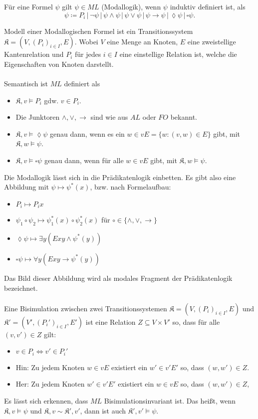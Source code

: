Für eine Formel $\psi$ gilt $\psi\in ML$ (Modallogik), wenn $\psi$ induktiv definiert ist, als
\[\psi\coloneqq P_i \,\vert\, \neg\psi \,\vert\, \psi\land\psi \,\vert\, \psi\lor\psi \,\vert\, \psi\rightarrow\psi \,\vert\, \lozenge\psi \,\vert\, \square\psi.\]

Modell einer Modallogischen Formel ist ein Transitionssystem $\mathfrak{K}=(V,(P_i)_{i\in I}, E)$. Wobei $V$ eine Menge an Knoten, $E$ eine zweistellige Kantenrelation und $P_i$ für jedes $i\in I$ eine einstellige Relation ist, welche die Eigenschaften von Knoten darstellt.
\\
\\
Semantisch ist $ML$ definiert als
\begin{itemize}
	\item $\mathfrak{K},v\models P_i$ gdw. $v\in P_i$.
	\item Die Junktoren $\land,\lor,\rightarrow$ sind wie aus $AL$ oder $FO$ bekannt.
	\item $\mathfrak{K},v\models \lozenge \psi$ genau dann, wenn es ein $w\in vE=\{w:(v,w)\in E\}$ gibt, mit $\mathfrak{K},w\models \psi$.
	\item $\mathfrak{K},v\models \square \psi$ genau dann, wenn für alle $w\in vE$ gibt, mit $\mathfrak{K},w\models \psi$.
\end{itemize}
Die Modallogik lässt sich in die Prädikatenlogik einbetten. Es gibt also eine Abbildung mit $\psi\mapsto \psi^\ast(x)$, bzw. nach Formelaufbau:

\begin{itemize}
	\item $P_i\mapsto P_i x$
	\item $\psi_1\circ \psi_2\mapsto \psi_1^\ast(x)\circ\psi_2^\ast(x)$ für $\circ\in\{\land,\lor,\rightarrow\}$
	\item $\lozenge\psi\mapsto\exists y (Exy \land \psi^\ast(y))$
	\item $\square\psi \mapsto \forall y (Exy\rightarrow \psi^\ast(y))$
\end{itemize}
Das Bild dieser Abbildung wird als modales Fragment der Prädikatenlogik bezeichnet.
\\
\\
Eine Bisimulation zwischen zwei Transitionssystemen $\mathfrak{K}=(V,(P_i)_{i\in I}, E)$ und $\mathfrak{K}'=(V',(P_i')_{i\in I}, E')$ ist eine Relation $Z\subseteq V\times V'$ so, dass für alle $(v,v')\in Z$ gilt:
\begin{itemize}
	\item $v\in P_i\Leftrightarrow v'\in P_i'$
	\item Hin: Zu jedem Knoten $w\in vE$ existiert ein $w'\in v'E'$ so, dass $(w,w')\in Z$.
	\item Her: Zu jedem Knoten $w'\in v'E'$ existiert ein $w\in vE$ so, dass $(w,w')\in Z$,
\end{itemize}
Es lässt sich erkennen, dass $ML$ Bisimulationsinvariant ist. Das heißt, wenn $\mathfrak{K},v\models \psi$ und $\mathfrak{K},v\sim \mathfrak{K'},v'$, dann ist auch $\mathfrak{K}',v'\models \psi$.


